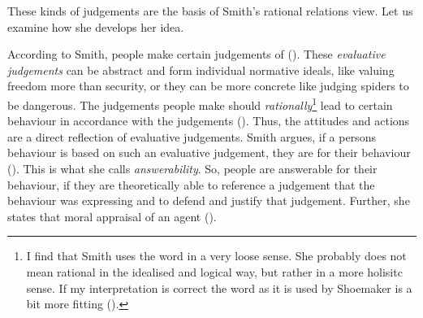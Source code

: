 \documentclass{article}
\begin{document}
%

 These kinds of judgements are the basis of Smith's rational relations view.
 Let us examine how she develops her idea.

 According to Smith, people make certain judgements of  (\cite[p. 251]{smith2005responsibility}). These
 \textit{evaluative judgements} can be abstract and form individual normative
 ideals, like valuing freedom more than security, or they can be more concrete
 like judging spiders to be dangerous. The judgements people make should
 \textit{rationally}\footnote{I find that Smith uses the word
	  in a very loose sense. She probably does not mean
	 rational in the idealised and logical way, but rather in a more
	 holisitc sense. If my interpretation is correct the word
  as it is used by Shoemaker is a bit more
 fitting (\cite[p. 23]{Shoemaker_2011}).} lead to certain behaviour in accordance with the
 judgements (\cite[p. 244, p. 247, p. 250]{smith2005responsibility}). Thus, the
 attitudes and actions are a direct reflection of evaluative judgements. Smith
 argues, if a persons behaviour is based on such an
 evaluative judgement, they are  for their behaviour (\cite[p.
 577-578]{smith2012attributability}). This is what she calls
 \textit{answerability}. So, people are answerable for their behaviour, if they
 are theoretically able to reference a judgement that the behaviour was
 expressing and to defend and justify that judgement. Further,
 she states that moral appraisal of an agent  (\cite[p. 578]{smith2012attributability}).
\end{document}
